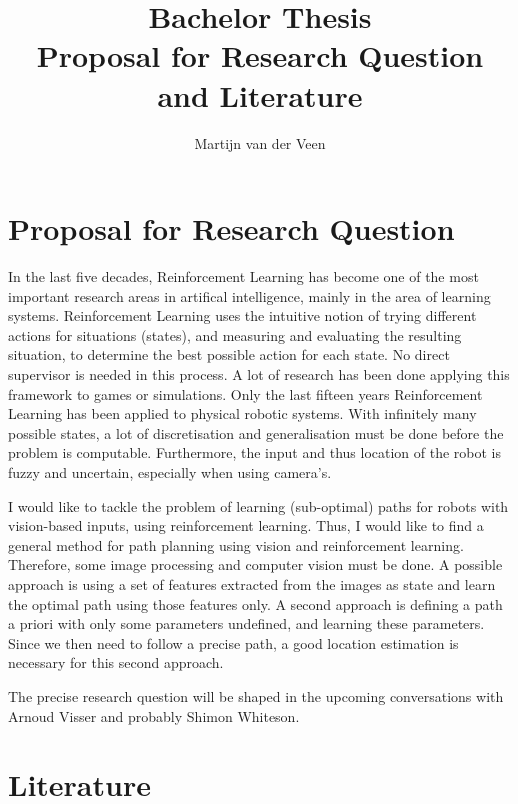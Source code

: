 \documentclass[11pt]{article}
\title{Bachelor Thesis \\
       Proposal for Research Question and Literature}
\author{Martijn van der Veen}
\begin{document}
\maketitle

\section*{Proposal for Research Question}
In the last five decades, Reinforcement Learning has become one of the most important research areas in artifical intelligence, mainly in the area of learning systems. Reinforcement Learning uses the intuitive notion of trying different actions for situations (states), and measuring and evaluating the resulting situation, to determine the best possible action for each state. No direct supervisor is needed in this process. A lot of research has been done applying this framework to games or simulations. Only the last fifteen years Reinforcement Learning has been applied to physical robotic systems. With infinitely many possible states, a lot of discretisation and generalisation must be done before the problem is computable. Furthermore, the input and thus location of the robot is fuzzy and uncertain, especially when using camera's.

I would like to tackle the problem of learning (sub-optimal) paths for robots with vision-based inputs, using reinforcement learning. Thus, I would like to find a general method for path planning using vision and reinforcement learning. Therefore, some image processing and computer vision must be done. A possible approach is using a set of features extracted from the images as state and learn the optimal path using those features only. A second approach is defining a path a priori with only some parameters undefined, and learning these parameters. Since we then need to follow a precise path, a good location estimation is necessary for this second approach.

The precise research question will be shaped in the upcoming conversations with Arnoud Visser and probably Shimon Whiteson.


\section*{Literature}
\end{document}
